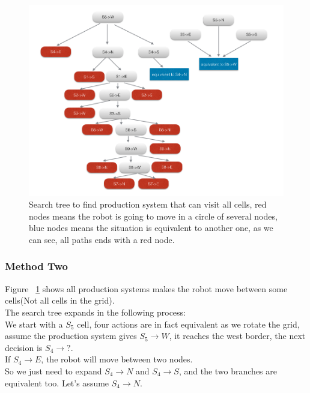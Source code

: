 \documentclass[paper=a4, fontsize=11pt]{scrartcl} %
\numberwithin{equation}{section} %
\numberwithin{figure}{section} %
\numberwithin{table}{section} %
\begin{document}
\begin{figure}[p]
    \vspace{\fill}
    \includegraphics[scale=0.5]{image6.png}
    \caption{Search tree to find production system that can visit all cells, 
        red nodes means the robot is going to move in a circle of several nodes,
        blue nodes means the situation is equivalent to another one, as we can see,
        all paths ends with a red node.}
    \label{fig:Problem1.2.2}
\end{figure}

\subsubsection{Method Two}

Figure ~\ref{fig:Problem1.2.2} shows all production systems makes the robot move between 
some cells(Not all cells in the grid).\\

The search tree expands in the following process:\\

We start with a $S_5$ cell, four actions are in fact equivalent as we rotate the grid, 
assume the production system gives $S_5 \rightarrow W$, it reaches the west border,
the next decision is $S_4 \rightarrow ?$. \\

If $S_4 \rightarrow E$, the robot will move between two nodes. \\
So we just need to expand $S_4 \rightarrow N$ and $S_4 \rightarrow S$,
and the two branches are equivalent too. Let's assume $S_4 \rightarrow N$.\\
\end{document}
